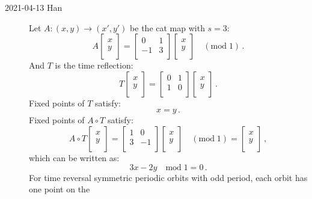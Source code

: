 \begin{description}
    \item[2021-04-13 Han]
Let $A: (x,y)\to (x',y')$ be the cat map with $s=3$:
\[
A
\left[
\begin{array}{c}
 x \\
 y \\
\end{array}
\right]
=
\left[
\begin{array}{cc}
 0 & 1 \\
 -1 & 3 \\
\end{array}
\right]
\left[
\begin{array}{c}
 x \\
 y \\
\end{array}
\right]
\quad (\mbox{mod}\;1) \,.
\]
And $T$ is the time reflection:
\[
T
\left[
\begin{array}{c}
 x \\
 y \\
\end{array}
\right]
=
\left[
\begin{array}{cc}
 0 & 1 \\
 1 & 0 \\
\end{array}
\right]
\left[
\begin{array}{c}
 x \\
 y \\
\end{array}
\right]
\,.
\]
Fixed points of $T$ satisfy:
\[
x=y \,.
\]
Fixed points of $A\circ T$ satisfy:
\[
A\circ T
\left[
\begin{array}{c}
 x \\
 y \\
\end{array}
\right]
=
\left[
\begin{array}{cc}
 1 & 0 \\
 3 & -1 \\
\end{array}
\right]
\left[
\begin{array}{c}
 x \\
 y \\
\end{array}
\right]
\quad (\mbox{mod}\;1)
=
\left[
\begin{array}{c}
 x \\
 y \\
\end{array}
\right]
\,,
\]
which can be written as:
\[
3x-2y
\quad \mbox{mod}\;1
=0 \,.
\]
For time reversal symmetric periodic orbits with odd period, each orbit has one point on the

\end{description}
